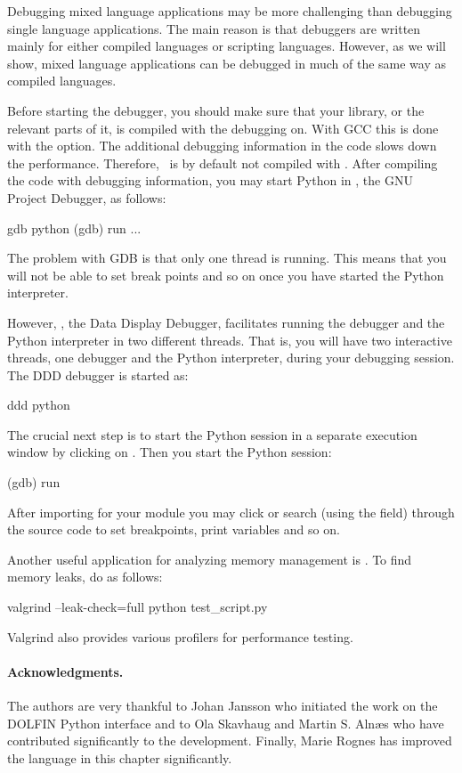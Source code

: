 Debugging mixed language applications may be more challenging than
debugging single language applications.  The main reason is that
debuggers are written mainly for either compiled languages or scripting
languages. However, as we will show, mixed language applications can be
debugged in much of the same way as compiled languages.

Before starting the debugger, you should make sure that your library,
or the relevant parts of it, is compiled with the debugging on. With
GCC this is done with the  option. The additional debugging
information in the code slows down the performance. Therefore, \dolfin\
is by default not compiled with .  After compiling the code
with debugging information, you may start Python in \citet{www:gdb},
the GNU Project Debugger, as follows:
\begin{bash}
gdb python
(gdb) run
...
\end{bash}
The problem with GDB is that only one thread is running. This means that
you will not be able to set break points and so on once you have started
the Python interpreter.

However, \citet{www:ddd}, the Data Display Debugger, facilitates running
the debugger and the Python interpreter in two different threads. That
is, you will have two interactive threads, one debugger and the Python
interpreter, during your debugging session. The DDD debugger is started
as:
\begin{bash}
ddd python
\end{bash}
The crucial next step is to start the Python session in a separate
execution window by clicking on \emp{View->Execution Window}.  Then you
start the Python session:
\begin{bash}
(gdb) run
\end{bash}
After importing for your module you may click or search (using the
\emp{Lookup} field) through the source code to set breakpoints, print
variables and so on.

Another useful application for analyzing memory management is
\citet{www:valgrind}. To find memory leaks, do as follows:
\begin{bash}
valgrind --leak-check=full python test_script.py
\end{bash}
Valgrind also provides various profilers for performance testing.

\paragraph{Acknowledgments.}

The authors are very thankful to Johan Jansson who initiated the work
on the DOLFIN Python interface and to Ola Skavhaug and Martin
S. Aln\ae s who have contributed significantly to the development.
Finally, Marie Rognes has improved the language in this chapter
significantly.
